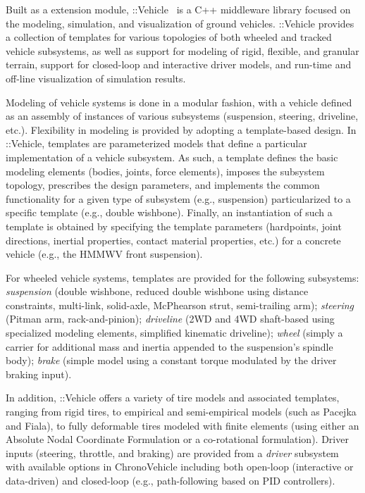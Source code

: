 \documentclass[12pt,twocolumn]{article}
\newcommand{\CHRONO}{{\sffamily{{Chrono}}}}
\newcommand{\ChronoVehicle}{{\sffamily{Chrono}}::Vehicle}
\begin{document}
Built as a {\CHRONO} extension module, {\ChronoVehicle}~\cite{ChronoVehicle_TR} is a C++ middleware library focused on the modeling, simulation, and visualization of ground vehicles.
%
{\ChronoVehicle} provides a collection of templates for various topologies of both wheeled and tracked vehicle subsystems, as well as support for modeling of rigid, flexible, and granular terrain, support for closed-loop and interactive driver models, and run-time and off-line visualization of simulation results.

Modeling of vehicle systems is done in a modular fashion, with a vehicle defined as an assembly of instances of various subsystems (suspension, steering, driveline, etc.).  Flexibility in modeling is provided by adopting a template-based design. In {\ChronoVehicle}, templates are parameterized models that define a particular implementation of a vehicle subsystem. As such, a template defines the basic modeling elements (bodies, joints, force elements), imposes the subsystem topology, prescribes the design parameters, and implements the common functionality for a given type of subsystem (e.g., suspension) particularized to a specific template (e.g., double wishbone). Finally, an instantiation of such a template is obtained by specifying the template parameters (hardpoints, joint directions, inertial properties, contact material properties, etc.) for a concrete vehicle (e.g., the HMMWV front suspension).

For wheeled vehicle systems, templates are provided for the following subsystems:
{\em suspension} (double wishbone, reduced double wishbone using distance constraints, multi-link, solid-axle, McPhearson strut, semi-trailing arm);
{\em steering} (Pitman arm, rack-and-pinion);
{\em driveline} (2WD and 4WD shaft-based using specialized {\CHRONO} modeling elements, simplified kinematic driveline);
{\em wheel} (simply a carrier for additional mass and inertia appended to the suspension's spindle body);
{\em brake} (simple model using a constant torque modulated by the driver braking input).

In addition, {\ChronoVehicle} offers a variety of tire models and associated templates, ranging from rigid tires, to empirical and semi-empirical models (such as Pacejka and Fiala), to fully deformable tires modeled with finite elements (using either an Absolute Nodal Coordinate Formulation or a co-rotational formulation).  Driver inputs (steering, throttle, and braking) are provided from a {\em driver} subsystem with available options in {ChronoVehicle} including both open-loop (interactive or data-driven) and closed-loop (e.g., path-following based on PID controllers).
\end{document}
